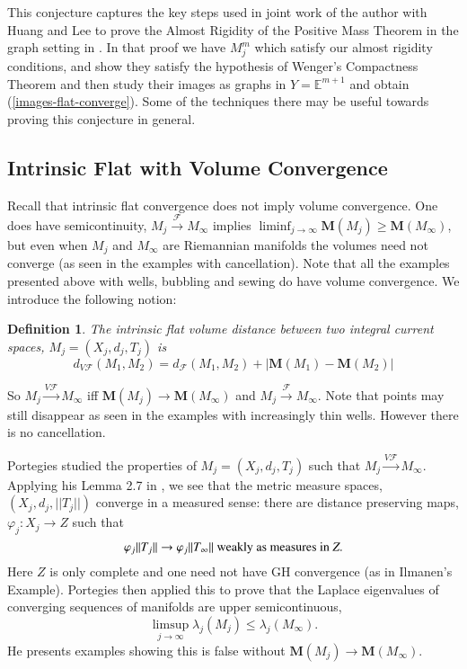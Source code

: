 \documentclass[12pt]{amsart}
\newtheorem{defn}[thm]{Definition}
\begin{document}
This conjecture captures the key steps used in joint work of the author
with Huang and Lee to prove the Almost Rigidity of
the Positive Mass Theorem in the graph setting in \cite{HLS}.
In that proof we have $M^m_j$ which satisfy our almost rigidity
conditions, and show they satisfy the hypothesis of Wenger's 
Compactness Theorem and then study their images as graphs in
$Y=\mathbb{E}^{m+1}$ and obtain (\ref{images-flat-converge}).
Some of the
techniques there may be useful towards proving this conjecture in
general.
  
\subsection{Intrinsic Flat with Volume Convergence}

Recall that intrinsic flat convergence does not imply
volume convergence. 
One does have semicontinuity, $M_j {\stackrel {\mathcal{F}}{\longrightarrow} } M_\infty$ implies 
$\liminf_{j\to \infty} {{\mathbf M}}(M_j) \ge {{\mathbf M}}(M_\infty)$, but even
when $M_j$ and $M_\infty$ are Riemannian manifolds the
volumes need not converge (as seen in the examples with
cancellation).  Note that all the examples presented
above with wells, 
bubbling and sewing do have volume convergence.
We introduce the following notion:

\begin{defn}\label{def-volF}
The intrinsic flat volume distance between two integral
current spaces, $M_j=(X_j, d_j, T_j)$ is
\begin{equation}
d_{V\mathcal{F}}(M_1, M_2) = d_{\mathcal{F}}(M_1, M_2)
+|{{\mathbf M}}(M_1) - {{\mathbf M}}(M_2)|
\end{equation}
\end{defn}

So $M_j {\stackrel {V\mathcal{F}}{\longrightarrow} } M_\infty$ iff ${{\mathbf M}}(M_j) \to {{\mathbf M}}(M_\infty)$
and $M_j {\stackrel {\mathcal{F}}{\longrightarrow} } M_\infty$.  Note that points may still disappear
as seen in the examples with increasingly thin wells.   However
there is no cancellation.  

Portegies studied the properties of $M_j=(X_j, d_j, T_j)$ such that
$M_j {\stackrel {V\mathcal{F}}{\longrightarrow} } M_\infty$.
Applying his Lemma 2.7 in \cite{Portegies-F-evalue}, we see that the metric 
measure spaces, 
$(X_j, d_j, ||T_j||)$ converge in 
a measured sense: there are distance preserving maps, $\varphi_j: X_j \to Z$
such that 
\begin{equation}\label{vol-to-measure}
\varphi_{j\*} ||T_j|| \to \varphi_{j\*} ||T_\infty|| \textrm{ weakly as measures in } Z.
\end{equation}
Here
$Z$ is only complete and one need not have GH convergence (as in Ilmanen's
Example).   Portegies then applied this to prove that the Laplace eigenvalues of
converging sequences of manifolds are upper semicontinuous,
\begin{equation}\label{evalues}
\limsup_{j\to \infty} \lambda_j(M_j) \le \lambda_j(M_\infty).
\end{equation}
He presents examples showing this is false without 
${{\mathbf M}}(M_j) \to {{\mathbf M}}(M_\infty)$.
\end{document}
